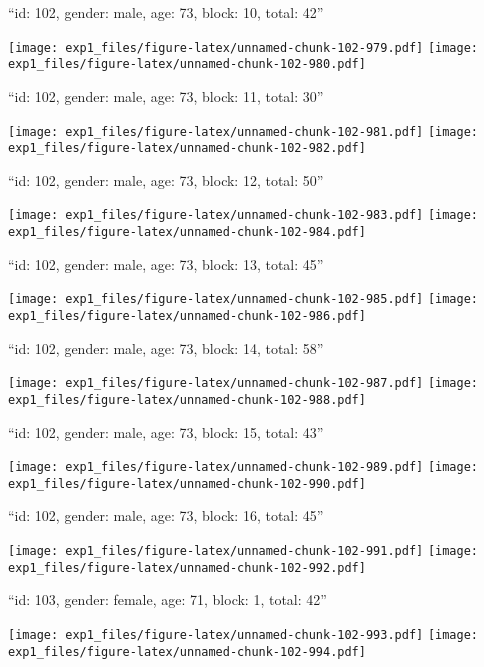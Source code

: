 \documentclass[11pt,,]{article}
\begin{document}
\newpage
[1] 

``id: 102, gender: male, age: 73, block: 10, total: 42''

\texttt{[image: exp1\_files/figure-latex/unnamed-chunk-102-979.pdf]}
\texttt{[image: exp1\_files/figure-latex/unnamed-chunk-102-980.pdf]}

\newpage
[1] 

``id: 102, gender: male, age: 73, block: 11, total: 30''

\texttt{[image: exp1\_files/figure-latex/unnamed-chunk-102-981.pdf]}
\texttt{[image: exp1\_files/figure-latex/unnamed-chunk-102-982.pdf]}

\newpage
[1] 

``id: 102, gender: male, age: 73, block: 12, total: 50''

\texttt{[image: exp1\_files/figure-latex/unnamed-chunk-102-983.pdf]}
\texttt{[image: exp1\_files/figure-latex/unnamed-chunk-102-984.pdf]}

\newpage
[1] 

``id: 102, gender: male, age: 73, block: 13, total: 45''

\texttt{[image: exp1\_files/figure-latex/unnamed-chunk-102-985.pdf]}
\texttt{[image: exp1\_files/figure-latex/unnamed-chunk-102-986.pdf]}

\newpage
[1] 

``id: 102, gender: male, age: 73, block: 14, total: 58''

\texttt{[image: exp1\_files/figure-latex/unnamed-chunk-102-987.pdf]}
\texttt{[image: exp1\_files/figure-latex/unnamed-chunk-102-988.pdf]}

\newpage
[1] 

``id: 102, gender: male, age: 73, block: 15, total: 43''

\texttt{[image: exp1\_files/figure-latex/unnamed-chunk-102-989.pdf]}
\texttt{[image: exp1\_files/figure-latex/unnamed-chunk-102-990.pdf]}

\newpage
[1] 

``id: 102, gender: male, age: 73, block: 16, total: 45''

\texttt{[image: exp1\_files/figure-latex/unnamed-chunk-102-991.pdf]}
\texttt{[image: exp1\_files/figure-latex/unnamed-chunk-102-992.pdf]}

\newpage
[1] 

``id: 103, gender: female, age: 71, block: 1, total: 42''

\texttt{[image: exp1\_files/figure-latex/unnamed-chunk-102-993.pdf]}
\texttt{[image: exp1\_files/figure-latex/unnamed-chunk-102-994.pdf]}
\end{document}
